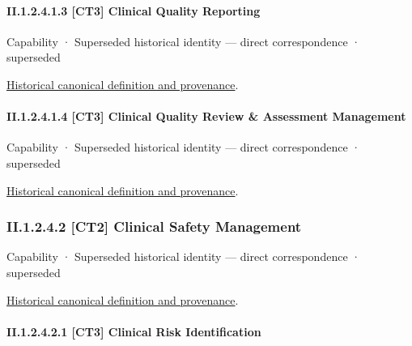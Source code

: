 \paragraph*{II.1.2.4.1.3 [CT3] Clinical Quality Reporting}
\label{navigation:II.1.2.4.1.3}

\label{element:e5812fcdf3f5465b9b1d8ba536075c5f}
{\small Capability · Superseded historical identity — direct correspondence · superseded}\par
\href{../../../../continuum/strategy/capability/e5812fcdf3f5465b9b1d8ba536075c5f.md}{Historical canonical definition and provenance}.\par
\paragraph*{II.1.2.4.1.4 [CT3] Clinical Quality Review \& Assessment Management}
\label{navigation:II.1.2.4.1.4}

\label{element:4b17ec92f0af4c4b9556912dbdd0f29f}
{\small Capability · Superseded historical identity — direct correspondence · superseded}\par
\href{../../../../continuum/strategy/capability/4b17ec92f0af4c4b9556912dbdd0f29f.md}{Historical canonical definition and provenance}.\par
\subsubsection*{II.1.2.4.2 [CT2] Clinical Safety Management}
\label{navigation:II.1.2.4.2}

\label{element:650ccec030fa46cc8c9d6b508a841778}
{\small Capability · Superseded historical identity — direct correspondence · superseded}\par
\href{../../../../continuum/strategy/capability/650ccec030fa46cc8c9d6b508a841778.md}{Historical canonical definition and provenance}.\par
\paragraph*{II.1.2.4.2.1 [CT3] Clinical Risk Identification}
\label{navigation:II.1.2.4.2.1}

